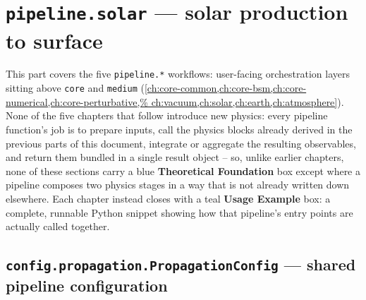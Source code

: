 \chapter{\texttt{pipeline.solar} --- solar production to surface}
\label{ch:pipeline-solar}

This part covers the five \texttt{pipeline.*} workflows: user-facing
orchestration layers sitting above \texttt{core} and \texttt{medium}
(\cref{ch:core-common,ch:core-bsm,ch:core-numerical,ch:core-perturbative,%
ch:vacuum,ch:solar,ch:earth,ch:atmosphere}). None of the five chapters that
follow introduce new physics: every pipeline function's job is to prepare
inputs, call the physics blocks already derived in the previous parts of
this document, integrate or aggregate the resulting observables, and return
them bundled in a single result object -- so, unlike earlier chapters, none
of these sections carry a blue \textbf{Theoretical Foundation} box except
where a pipeline composes two physics stages in a way that is not already
written down elsewhere. Each chapter instead closes with a teal
\textbf{Usage Example} box: a complete, runnable Python snippet showing how
that pipeline's entry points are actually called together.

\section{\texttt{config.propagation.PropagationConfig} --- shared pipeline configuration}
\label{sec:propagation-config}


